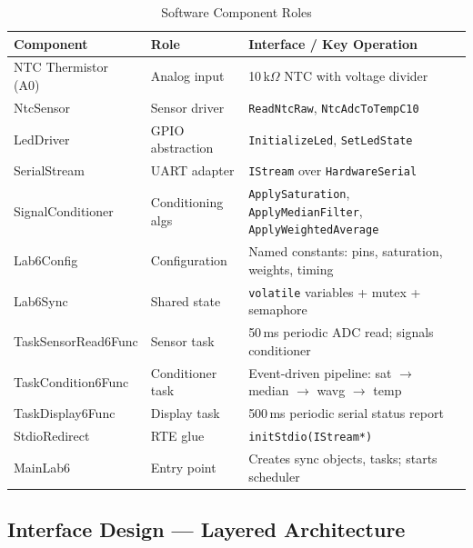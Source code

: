 \documentclass[12pt]{article}
\begin{document}
\begin{table}[H]
\centering
\begin{tabular}{@{}p{3.6cm}p{2.8cm}p{6.0cm}@{}}
\toprule
\textbf{Component} & \textbf{Role} & \textbf{Interface / Key Operation} \\
\midrule
NTC Thermistor (A0)          & Analog input       & 10\,k$\Omega$ NTC with voltage divider \\
NtcSensor                    & Sensor driver       & \texttt{ReadNtcRaw}, \texttt{NtcAdcToTempC10} \\
LedDriver                    & GPIO abstraction    & \texttt{InitializeLed}, \texttt{SetLedState} \\
SerialStream                 & UART adapter        & \texttt{IStream} over \texttt{HardwareSerial} \\
SignalConditioner             & Conditioning algs   & \texttt{ApplySaturation}, \texttt{ApplyMedianFilter}, \texttt{ApplyWeightedAverage} \\
Lab6Config                   & Configuration       & Named constants: pins, saturation, weights, timing \\
Lab6Sync                     & Shared state        & \texttt{volatile} variables + mutex + semaphore \\
TaskSensorRead6Func          & Sensor task         & 50\,ms periodic ADC read; signals conditioner \\
TaskCondition6Func           & Conditioner task    & Event-driven pipeline: sat $\to$ median $\to$ wavg $\to$ temp \\
TaskDisplay6Func             & Display task        & 500\,ms periodic serial status report \\
StdioRedirect                & RTE glue            & \texttt{initStdio(IStream*)} \\
MainLab6                     & Entry point         & Creates sync objects, tasks; starts scheduler \\
\bottomrule
\end{tabular}
\caption{Software Component Roles}
\label{tab:components}
\end{table}

\subsection{Interface Design --- Layered Architecture}
\end{document}
